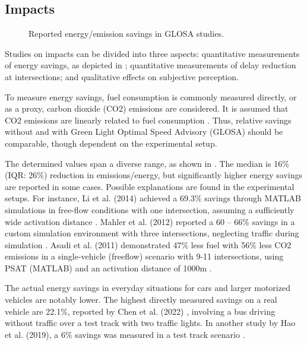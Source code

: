 \subsection{Impacts}

\begin{figure}
\centering
\resizebox{\linewidth}{!}{%

}
\caption{Reported energy/emission savings in GLOSA studies.}
\label{fig:related-work-energy-savings}
\end{figure}
Studies on impacts can be divided into three aspects: quantitative measurements of energy savings, as depicted in ; quantitative measurements of delay reduction at intersections; and qualitative effects on subjective perception.

To measure energy savings, fuel consumption is commonly measured directly, or as a proxy, carbon dioxide (CO2) emissions are considered. It is assumed that CO2 emissions are linearly related to fuel consumption \cite{seredynski_comparison_2013, seredynski_multi-segment_2013}. Thus, relative savings without and with Green Light Optimal Speed Advisory (GLOSA) should be comparable, though dependent on the experimental setup.

The determined values span a diverse range, as shown in . The median is 16\% (IQR: 26\%) reduction in emissions/energy, but significantly higher energy savings are reported in some cases. Possible explanations are found in the experimental setups. For instance, Li et al. (2014) achieved a 69.3\% savings through MATLAB simulations in free-flow conditions with one intersection, assuming a sufficiently wide activation distance \cite{li_multi-vehicles_2014}. Mahler et al. (2012) reported a 60 -- 66\% savings in a custom simulation environment with three intersections, neglecting traffic during simulation \cite{mahler_reducing_2012}. Asadi et al. (2011) demonstrated 47\% less fuel with 56\% less CO2 emissions in a single-vehicle (freeflow) scenario with 9-11 intersections, using PSAT (MATLAB) and an activation distance of 1000m \cite{asadi_predictive_2011}.

The actual energy savings in everyday situations for cars and larger motorized vehicles are notably lower. The highest directly measured savings on a real vehicle are 22.1\%, reported by Chen et al. (2022) \cite{chen_developing_2022}, involving a bus driving without traffic over a test track with two traffic lights. In another study by Hao et al. (2019), a 6\% savings was measured in a test track scenario \cite{hao_eco-approach_2019}.

